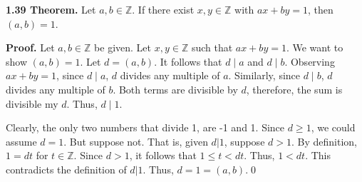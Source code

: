 \documentclass[12pt]{article}
\begin{document}
\noindent\textbf{1.39 Theorem.} Let $a,b\in\mathbb{Z}$. If there exist $x,y\in\mathbb{Z}$ with $ax+by=1$, then $(a,b)=1$.

\bigskip
\noindent\textbf{Proof.} Let $a,b\in\mathbb{Z}$ be given. Let $x,y\in\mathbb{Z}$ such that $ax+by=1$. We want to show $(a,b)=1$. Let $d=(a,b)$. It follows that $d\mid a$ and $d\mid b$. Observing $ax+by=1$, since $d\mid a$, $d$ divides any multiple of $a$. Similarly, since $d\mid b$, $d$ divides any multiple of $b$. Both terms are divisible by $d$, therefore, the sum is divisible my $d$. Thus, $d\mid 1$.

\bigskip

\noindent Clearly, the only two numbers that divide 1, are -1 and 1. Since $d\geq 1$, we could assume $d=1$. But suppose not. That is, given $d|1$, suppose $d>1$. By definition, $1=dt$ for $t\in\mathbb{Z}$. Since $d>1$, it follows that $1\leq t < dt$. Thus, $1<dt$. This contradicts the definition of $d|1$. Thus, $d=1=(a,b)$.\qed
\end{document}
